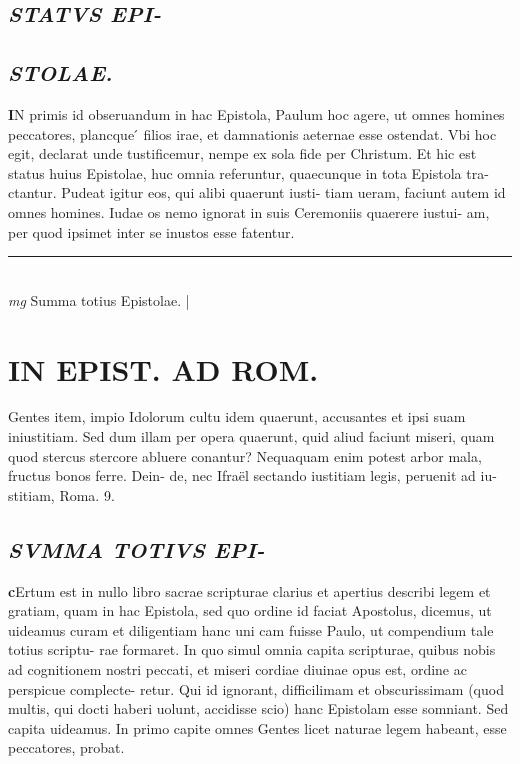 \documentclass{article}
\begin{document}
\begin{pages}
\subsection*{\textit{STATVS EPI- }}
{}
\subsection*{\textit{STOLAE.  }}\pstart \huge\textbf{I}\normalsize N primis id obseruandum in hac Epistola, Paulum hoc agere, ut omnes homines peccatores, plancque ́ filios irae, et damnationis aeternae esse ostendat. Vbi hoc egit, declarat unde tustificemur, nempe ex sola fide per Christum. Et hic est status huius Epistolae, huc omnia referuntur, quaecunque in tota Epistola tra- ctantur. Pudeat igitur eos, qui alibi quaerunt iusti- tiam ueram, faciunt autem id omnes homines. Iudae os nemo ignorat in suis Ceremoniis quaerere iustui- am, per quod ipsimet inter se inustos esse fatentur.  \pend
\vspace{0.5cm}\noindent
\vspace{0.2cm}\rule{1cm}{0.2pt}\\ 
\hspace{0.2cm}\textit{mg}
\footnotesize Summa totius Epistolae. 
\normalsize| 
\section*{IN EPIST. AD ROM.  }
\marginpar{[ p.2 ]}
\marginpar{[ p.1 ]}
\marginpar{[ p.11 ]}\pstart Gentes item, impio Idolorum cultu idem quaerunt, accusantes et ipsi suam iniustitiam. Sed dum illam per opera quaerunt, quid aliud faciunt miseri, quam quod stercus stercore abluere conantur? Nequaquam enim potest arbor mala, fructus bonos ferre. Dein- de, nec Ifraël sectando iustitiam legis, peruenit ad iu- stitiam, Roma. 9.   \pend
{}
{}
\subsection*{\textit{SVMMA TOTIVS EPI- }}\pstart \huge\textbf{c}\normalsize Ertum est in nullo libro sacrae scripturae clarius et apertius describi legem et gratiam, quam in hac Epistola, sed quo ordine id faciat Apostolus, dicemus, ut uideamus curam et diligentiam hanc uni cam fuisse Paulo, ut compendium tale totius scriptu- rae formaret. In quo simul omnia capita scripturae, quibus nobis ad cognitionem nostri peccati, et miseri cordiae diuinae opus est, ordine ac perspicue complecte- retur. Qui id ignorant, difficilimam et obscurissimam (quod multis, qui docti haberi uolunt, accidisse scio) hanc Epistolam esse somniant. Sed capita uideamus.  In primo capite omnes Gentes licet naturae legem habeant, esse peccatores, probat.   \pend
{}
{}

\end{pages}
\end{document}

